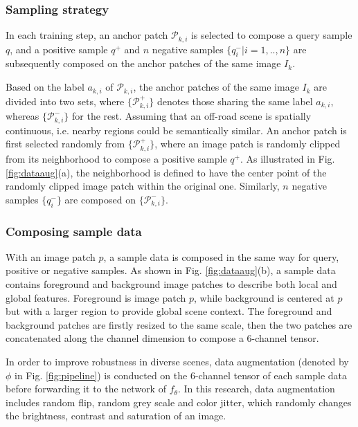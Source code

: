 \documentclass[letterpaper, 10 pt, conference]{ieeeconf}  %
\begin{document}
\subsubsection {Sampling strategy}

In each training step, an anchor patch $\mathcal{P}_{k,i}$ is selected to compose a query sample $q$, and a positive sample $q^+$ and $n$ negative samples $\{q^-_i|i=1,..,n\}$ are subsequently composed on the anchor patches of the same image $I_k$.

Based on the label $a_{k,i}$ of $\mathcal{P}_{k,i}$, the anchor patches of the same image $I_k$ are divided into two sets, where $\{\mathcal{P}_{k,i}^+\}$ denotes those sharing the same label $a_{k,i}$, whereas $\{\mathcal{P}_{k,i}^-\}$ for the rest.
Assuming that an off-road scene is spatially continuous, i.e. nearby regions could be semantically similar.
An anchor patch is first selected randomly from $\{\mathcal{P}_{k,i}^+\}$, where an image patch is randomly clipped from its neighborhood to compose a positive sample $q^+$. As illustrated in Fig. \ref{fig:dataaug}(a), the neighborhood is defined to have the center point of the randomly clipped image patch within the original one. Similarly, $n$ negative samples $\{q^-_i\}$ are composed on $\{\mathcal{P}_{k,i}^-\}$.

\subsubsection{Composing sample data}

With an image patch $p$, a sample data is composed in the same way for query, positive or negative samples.
As shown in Fig. \ref{fig:dataaug}(b), a sample data contains foreground and background image patches to describe both local and global features. Foreground is image patch $p$, while background is centered at $p$ but with a larger region to provide global scene context. The foreground and background patches are firstly resized to the same scale, then the two patches are concatenated along the channel dimension to compose a 6-channel tensor.

In order to improve robustness in diverse scenes, data augmentation (denoted by $\phi$ in Fig. \ref{fig:pipeline}) is conducted on the 6-channel tensor of each sample data before forwarding it to the network of $f_{\theta}$. In this research, data augmentation includes random flip, random grey scale and color jitter, which randomly changes the brightness, contrast and saturation of an image.
\end{document}
